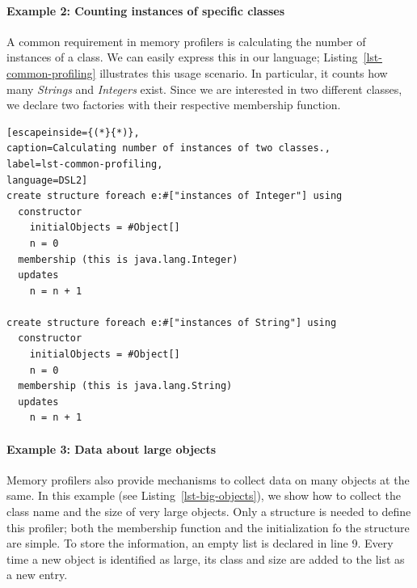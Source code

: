 \paragraph{Example 2: Counting instances of specific classes}
A common requirement in memory profilers is calculating the number of instances of a class.
We can easily express this in our language; Listing~\ref{lst-common-profiling} illustrates this usage scenario.
In particular, it counts how many \textit{Strings} and \textit{Integers} exist. 
Since we are interested in two different classes, we declare two factories with their respective membership function.
\begin{lstlisting}[escapeinside={(*}{*)},
caption=Calculating number of instances of two classes., 
label=lst-common-profiling,
language=DSL2]
create structure foreach e:#["instances of Integer"] using
  constructor
    initialObjects = #Object[]
    n = 0
  membership (this is java.lang.Integer)
  updates
    n = n + 1

create structure foreach e:#["instances of String"] using
  constructor
    initialObjects = #Object[]
    n = 0
  membership (this is java.lang.String)
  updates
    n = n + 1
\end{lstlisting}

\paragraph{Example 3: Data about large objects} 
Memory profilers also provide mechanisms to collect data on many objects at the same.
In this example (see Listing~\ref{lst-big-objects}), we show how to collect the class name and the size of very large objects.
Only a structure is needed to define this profiler; both the membership function and the initialization fo the structure are simple.
To store the information, an empty list is declared in line 9.
Every time a new object is identified as large, its class and size are added to the list as a new entry. 

